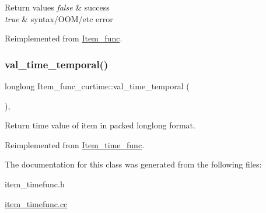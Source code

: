 \begin{DoxyRetVals}{Return values}
{\em false} & success \\
\hline
{\em true} & syntax/\+O\+O\+M/etc error \\
\hline
\end{DoxyRetVals}


Reimplemented from \mbox{\hyperlink{classItem__func_a6413cdbe7b14be77cc47462c9fc87ddb}{Item\+\_\+func}}.

\mbox{\label{classItem__func__curtime_a58e6e51156871d1b5e844993c88cf053}} 
\subsubsection{\texorpdfstring{val\+\_\+time\+\_\+temporal()}{val\_time\_temporal()}}
{\footnotesize\ttfamily longlong Item\+\_\+func\+\_\+curtime\+::val\+\_\+time\+\_\+temporal (\begin{DoxyParamCaption}{ }\end{DoxyParamCaption})\hspace{0.3cm}{\ttfamily [inline]}, {\ttfamily [virtual]}}

Return time value of item in packed longlong format. 

Reimplemented from \mbox{\hyperlink{classItem__time__func_ac6f281d250770126e010750dff54ef36}{Item\+\_\+time\+\_\+func}}.



The documentation for this class was generated from the following files\+:\begin{DoxyCompactItemize}
\item 
item\+\_\+timefunc.\+h\item 
\mbox{\hyperlink{item__timefunc_8cc}{item\+\_\+timefunc.\+cc}}\end{DoxyCompactItemize}
